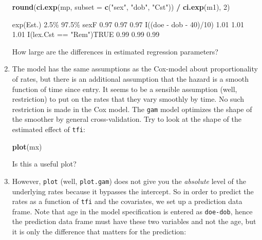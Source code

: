 \documentclass[
]{book}
\newenvironment{Shaded}{\begin{snugshade}}{\end{snugshade}}
\newcommand{\AttributeTok}[1]{\textcolor[rgb]{0.13,0.29,0.53}{#1}}
\newcommand{\DecValTok}[1]{\textcolor[rgb]{0.00,0.00,0.81}{#1}}
\newcommand{\FunctionTok}[1]{\textcolor[rgb]{0.13,0.29,0.53}{\textbf{#1}}}
\newcommand{\NormalTok}[1]{#1}
\newcommand{\SpecialCharTok}[1]{\textcolor[rgb]{0.81,0.36,0.00}{\textbf{#1}}}
\newcommand{\StringTok}[1]{\textcolor[rgb]{0.31,0.60,0.02}{#1}}
\begin{document}
\begin{enumerate}
\begin{Shaded}
\begin{Highlighting}[]
\FunctionTok{round}\NormalTok{(}\FunctionTok{ci.exp}\NormalTok{(mp, }\AttributeTok{subset =} \FunctionTok{c}\NormalTok{(}\StringTok{"sex"}\NormalTok{, }\StringTok{"dob"}\NormalTok{, }\StringTok{"Cst"}\NormalTok{)) }\SpecialCharTok{/} \FunctionTok{ci.exp}\NormalTok{(m1), }\DecValTok{2}\NormalTok{)}
\end{Highlighting}
\end{Shaded}

\begin{Shaded}
\begin{Highlighting}[]
\NormalTok{                        exp(Est.) 2.5\% 97.5\%}
\NormalTok{sexF                         0.97 0.97  0.97}
\NormalTok{I((doe {-} dob {-} 40)/10)       1.01 1.01  1.01}
\NormalTok{I(lex.Cst == "Rem")TRUE      0.99 0.99  0.99}
\end{Highlighting}
\end{Shaded}

  How large are the differences in estimated regression parameters?
\item
  The model has the same assumptions as the Cox-model about
  proportionality of rates, but there is an additional assumption that
  the hazard is a smooth function of time since entry. It seems to be
  a sensible assumption (well, restriction) to put on the rates that
  they vary smoothly by time. No such restriction is made in the Cox
  model. The \texttt{gam} model optimizes the shape of the smoother by
  general cross-validation. Try to look at the shape of the
  estimated effect of \texttt{tfi}:

\begin{Shaded}
\begin{Highlighting}[]
\FunctionTok{plot}\NormalTok{(mx)}
\end{Highlighting}
\end{Shaded}

  Is this a useful plot?
\item
  However, \texttt{plot} (well, \texttt{plot.gam}) does not give you the \emph{absolute}
  level of the underlying rates because it bypasses the intercept. So
  in order to predict the rates as a function of \texttt{tfi} and the
  covariates, we set up a prediction data frame. Note that age
  in the model specification is entered as \texttt{doe-dob}, hence
  the prediction data frame must have these two variables and not
  the age, but it is only the difference that matters for the prediction:


\end{enumerate}
\end{document}
